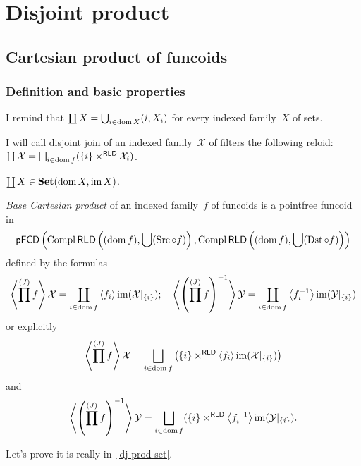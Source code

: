 \chapter{Disjoint product}

\section{Cartesian product of funcoids}

\subsection{Definition and basic properties}

I remind that
$\coprod X = \bigcup_{i\in\operatorname{dom} X} (i,X_i)$
for every indexed family~$X$ of sets.

\begin{defn}
I will call disjoint join of an indexed family~$\mathcal{X}$ of filters the following reloid: $\coprod\mathcal{X} = \bigsqcup_{i\in\dom f}(\{i\}\times^{\mathsf{RLD}}\mathcal{X}_i)$.
\end{defn}

\begin{obvious}
$\coprod X\in\mathbf{Set}(\operatorname{dom} X,\operatorname{im} X)$.
\end{obvious}

\begin{defn}
\emph{Base Cartesian product} of an indexed family~$f$ of funcoids is
a pointfree funcoid in
\begin{equation}\label{dj-prod-set}
\mathsf{pFCD}\left(\operatorname{Compl}\mathsf{RLD}\left((\operatorname{dom} f),\bigcup(\operatorname{Src}\circ f)\right), \operatorname{Compl}\mathsf{RLD}\left((\operatorname{dom} f),\bigcup(\operatorname{Dst}\circ f)\right)\right)
\end{equation}
defined by the formulas
\[
\left\langle \prod^{(J)}f\right\rangle \mathcal{X} =
\coprod_{i\in\operatorname{dom} f}\left\langle f_i\right\rangle\operatorname{im}(\mathcal{X}|_{\{i\}});\quad
\left\langle \left(\prod^{(J)}f\right)^{-1}\right\rangle \mathcal{Y} =
\coprod_{i\in\operatorname{dom} f}\left\langle f_i^{-1}\right\rangle\operatorname{im}(\mathcal{Y}|_{\{i\}})
\]
or explicitly
\[
\supfun{\prod^{(J)}f} \mathcal{X} =
\bigsqcup_{i\in\dom f}
\left(\{i\}\times^{\mathsf{RLD}}\supfun{f_i}\im(\mathcal{X}|_{\{i\}})\right)
\]
and
\[
\supfun{\left(\prod^{(J)}f\right)^{-1}} \mathcal{Y} =
\bigsqcup_{i\in\dom f}
(\{i\}\times^{\mathsf{RLD}}\supfun{f_i^{-1}}\im(\mathcal{Y}|_{\{i\}}).
\]
\end{defn}

Let's prove it is really in~\eqref{dj-prod-set}.

